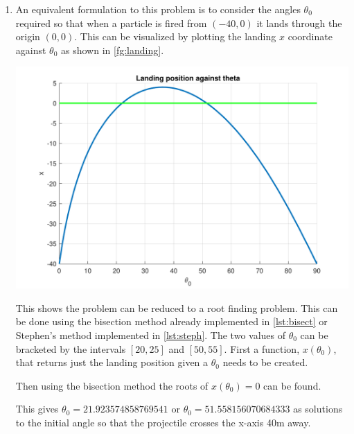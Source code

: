 \documentclass[a4paper,11pt]{article}
\begin{document}
\begin{enumerate}
	
	\item An equivalent formulation to this problem is to consider the angles 
	$\theta_{0}$ required so that when a particle is fired from $(-40,0)$ it 
	lands through the origin $(0,0)$. This can be visualized by plotting the 
	landing $x$ coordinate against $\theta_{0}$ as shown in 
	\autoref{fg:landing}.
	\begin{center}
		\includegraphics[scale=0.7]{images/Q3f.pdf}
		\label{fg:landing}
	\end{center}
	This shows the problem can be reduced to a root finding problem. This can 
	be done using the bisection method already implemented in 
	\autoref{lst:bisect} or Stephen's method implemented in 
	\autoref{lst:steph}. The two values of $\theta_{0}$ can be bracketed by 
	the 
	intervals $[20,25]$ and $[50,55]$. First a function, $x(\theta_{0})$, 
	that 
	returns just the 
	landing 
	position given a $\theta_{0}$ needs to be created.
	
	Then using the bisection method the roots of $x(\theta_{0}) = 0$ can be 
	found.
	
	This gives $\theta_{0} = 21.923574858769541$ or $\theta_{0} = 
	51.558156070684333$ as 
	solutions to the initial angle so that the projectile crosses the x-axis 
	40m away.
\end{enumerate}
\newpage
\printbibliography[
heading=bibintoc,
title={Bibliography}
]
\newpage
\end{document}
